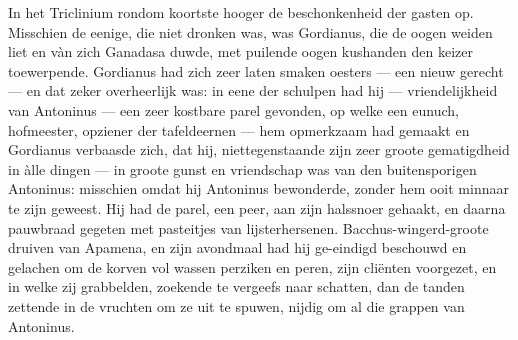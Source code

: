 \documentclass[a4paper, 12pt, oneside, dutch]{article}
\begin{document}
In het Triclinium rondom koortste hooger de beschonkenheid der gasten op. Misschien de eenige, die niet dronken was, was Gordianus, die de oogen weiden liet en vàn zich Ganadasa duwde, met puilende oogen kushanden den keizer toewerpende. Gordianus had zich zeer laten smaken oesters --- een nieuw gerecht --- en dat zeker overheerlijk was: in eene der schulpen had hij --- vriendelijkheid van Antoninus --- een zeer kostbare parel gevonden, op welke een eunuch, hofmeester, opziener der tafeldeernen --- hem opmerkzaam had gemaakt en Gordianus verbaasde zich, dat hij, niettegenstaande zijn zeer groote gematigdheid in àlle dingen --- in groote gunst en vriendschap was van den buitensporigen Antoninus: misschien omdat hij Antoninus bewonderde, zonder hem ooit minnaar te zijn geweest. Hij had de parel, een peer, aan zijn halssnoer gehaakt, en daarna pauwbraad gegeten met pasteitjes van lijsterhersenen. Bacchus-wingerd-groote druiven van Apamena, en zijn avondmaal had hij ge-eindigd beschouwd en gelachen om de korven vol wassen perziken en peren, zijn cliënten voorgezet, en in welke zij grabbelden, zoekende te vergeefs naar schatten, dan de tanden zettende in de vruchten om ze uit te spuwen, nijdig om al die grappen van Antoninus.
\end{document}
